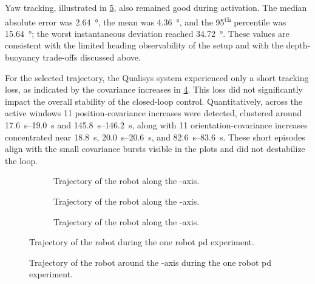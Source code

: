 Yaw tracking, illustrated in \cref{e_rcce_r_pd_pose_wz}, also remained good during activation. The
median absolute error was \qty{2.64}{\degree}, the mean was \qty{4.36}{\degree}, and the
\num{95}\textsuperscript{th} percentile was \qty{15.64}{\degree}; the worst instantaneous deviation
reached \qty{34.72}{\degree}. These values are consistent with the limited heading observability of
the setup and with the depth-buoyancy trade-offs discussed above.

For the selected trajectory, the Qualisys system experienced only a short tracking loss, as
indicated by the covariance increases in \cref{e_rcce_r_pd_poses}. This loss did not significantly
impact the overall stability of the closed-loop control. Quantitatively, across the active windows
\num{11} position-covariance increases were detected, clustered around
\qtyrange{17.6}{19.0}{\second} and \qtyrange{145.8}{146.2}{\second}, along with \num{11}
orientation-covariance increases concentrated near \qty{18.8}{\second},
\qtyrange{20.0}{20.6}{\second}, and \qtyrange{82.6}{83.6}{\second}. These short episodes align with
the small covariance bursts visible in the plots and did not destabilize the loop.

\begin{figure}
	\centering
	\begin{subfigure}{\figurewidth}
		\centering
		\caption{Trajectory of the robot along the -axis.}
		\label{e_rcce_r_pd_pose_x}
	\end{subfigure}
	\begin{subfigure}{\figurewidth}
		\centering
		\caption{Trajectory of the robot along the -axis.}
		\label{e_rcce_r_pd_pose_y}
	\end{subfigure}
	\begin{subfigure}{\figurewidth}
		\centering
		\caption{Trajectory of the robot along the -axis.}
		\label{e_rcce_r_pd_pose_z}
	\end{subfigure}
	\caption{Trajectory of the robot during the one robot \ac{pd} experiment.}
	\label{e_rcce_r_pd_poses}
\end{figure}

\begin{figure}
	\centering
	\caption{Trajectory of the robot around the -axis during the one robot \ac{pd} experiment.}
	\label{e_rcce_r_pd_pose_wz}
\end{figure}


